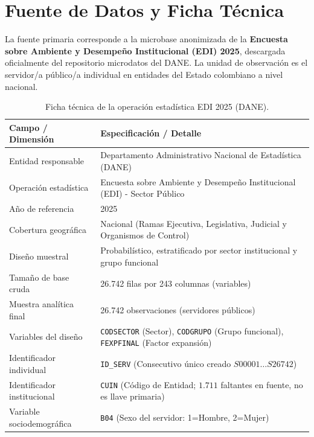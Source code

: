 \documentclass[11pt, a4paper]{article} %
\begin{document}
\section{Fuente de Datos y Ficha Técnica}

La fuente primaria corresponde a la microbase anonimizada de la \textbf{Encuesta sobre Ambiente y Desempeño Institucional (EDI) 2025}, descargada oficialmente del repositorio microdatos del DANE. La unidad de observación es el servidor/a público/a individual en entidades del Estado colombiano a nivel nacional.

\begin{table}[H]
\centering
\caption{Ficha técnica de la operación estadística EDI 2025 (DANE).}
\label{tab:ficha_tecnica}
\footnotesize
\begin{tabularx}{\textwidth}{l X}
\toprule
\textbf{Campo / Dimensión} & \textbf{Especificación / Detalle} \\
\midrule
Entidad responsable & Departamento Administrativo Nacional de Estadística (DANE) \\
Operación estadística & Encuesta sobre Ambiente y Desempeño Institucional (EDI) - Sector Público \\
Año de referencia & 2025 \\
Cobertura geográfica & Nacional (Ramas Ejecutiva, Legislativa, Judicial y Organismos de Control) \\
Diseño muestral & Probabilístico, estratificado por sector institucional y grupo funcional \\
Tamaño de base cruda & 26.742 filas por 243 columnas (variables) \\
Muestra analítica final & 26.742 observaciones (servidores públicos) \\
Variables del diseño & \texttt{CODSECTOR} (Sector), \texttt{CODGRUPO} (Grupo funcional), \texttt{FEXPFINAL} (Factor expansión) \\
Identificador individual & \texttt{ID\_SERV} (Consecutivo único creado $S00001 \dots S26742$) \\
Identificador institucional & \texttt{CUIN} (Código de Entidad; $1.711$ faltantes en fuente, no es llave primaria) \\
Variable sociodemográfica & \texttt{B04} (Sexo del servidor: 1=Hombre, 2=Mujer) \\
\bottomrule
\end{tabularx}
\end{table}
\end{document}

